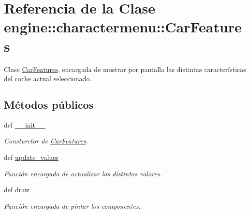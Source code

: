 \hypertarget{classengine_1_1charactermenu_1_1CarFeatures}{
\section{\-Referencia de la \-Clase engine\-:\-:charactermenu\-:\-:\-Car\-Features}
\label{classengine_1_1charactermenu_1_1CarFeatures}
}


\-Clase \hyperlink{classengine_1_1charactermenu_1_1CarFeatures}{\-Car\-Features}, encargada de mostrar por pantalla las distintas características del coche actual seleccionado.  


\subsection*{\-Métodos públicos}
\begin{DoxyCompactItemize}
\item 
def \hyperlink{classengine_1_1charactermenu_1_1CarFeatures_a6bd8ac01b4850f6a87b9ed7f06d45201}{\-\_\-\-\_\-init\-\_\-\-\_\-}
\begin{DoxyCompactList}\small\item\em \-Consturctor de \hyperlink{classengine_1_1charactermenu_1_1CarFeatures}{\-Car\-Features}. \end{DoxyCompactList}\item 
def \hyperlink{classengine_1_1charactermenu_1_1CarFeatures_a3191251d4e48cd7fa54d3e55bef3dd7a}{update\-\_\-values}
\begin{DoxyCompactList}\small\item\em \-Función encargada de actualizar los distintos valores. \end{DoxyCompactList}\item 
def \hyperlink{classengine_1_1charactermenu_1_1CarFeatures_a867740b784f3fae86d6c959faaf3c273}{draw}
\begin{DoxyCompactList}\small\item\em \-Función encargada de pintar los componentes. \end{DoxyCompactList}\end{DoxyCompactItemize}
